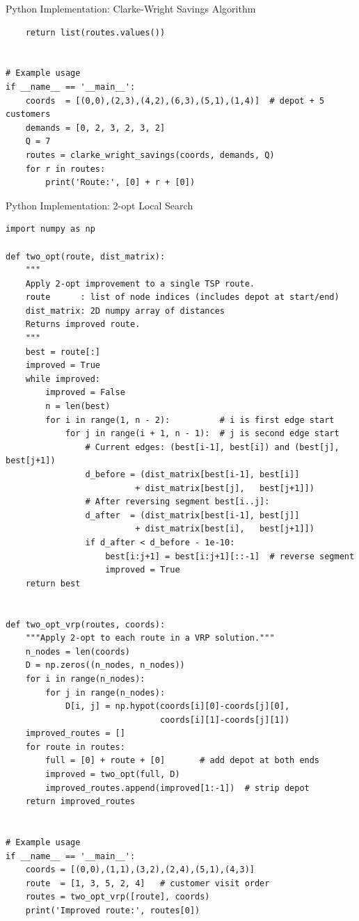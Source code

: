 \documentclass[aspectratio=169,10pt]{beamer}
\begin{document}
\begin{frame}[fragile]{Python Implementation: Clarke-Wright Savings Algorithm}
\begin{lstlisting}
    return list(routes.values())


# Example usage
if __name__ == '__main__':
    coords  = [(0,0),(2,3),(4,2),(6,3),(5,1),(1,4)]  # depot + 5 customers
    demands = [0, 2, 3, 2, 3, 2]
    Q = 7
    routes = clarke_wright_savings(coords, demands, Q)
    for r in routes:
        print('Route:', [0] + r + [0])
\end{lstlisting}
\end{frame}

\begin{frame}[fragile]{Python Implementation: 2-opt Local Search}
\begin{lstlisting}
import numpy as np

def two_opt(route, dist_matrix):
    """
    Apply 2-opt improvement to a single TSP route.
    route      : list of node indices (includes depot at start/end)
    dist_matrix: 2D numpy array of distances
    Returns improved route.
    """
    best = route[:]
    improved = True
    while improved:
        improved = False
        n = len(best)
        for i in range(1, n - 2):          # i is first edge start
            for j in range(i + 1, n - 1):  # j is second edge start
                # Current edges: (best[i-1], best[i]) and (best[j], best[j+1])
                d_before = (dist_matrix[best[i-1], best[i]]
                          + dist_matrix[best[j],   best[j+1]])
                # After reversing segment best[i..j]:
                d_after  = (dist_matrix[best[i-1], best[j]]
                          + dist_matrix[best[i],   best[j+1]])
                if d_after < d_before - 1e-10:
                    best[i:j+1] = best[i:j+1][::-1]  # reverse segment
                    improved = True
    return best


def two_opt_vrp(routes, coords):
    """Apply 2-opt to each route in a VRP solution."""
    n_nodes = len(coords)
    D = np.zeros((n_nodes, n_nodes))
    for i in range(n_nodes):
        for j in range(n_nodes):
            D[i, j] = np.hypot(coords[i][0]-coords[j][0],
                               coords[i][1]-coords[j][1])
    improved_routes = []
    for route in routes:
        full = [0] + route + [0]       # add depot at both ends
        improved = two_opt(full, D)
        improved_routes.append(improved[1:-1])  # strip depot
    return improved_routes


# Example usage
if __name__ == '__main__':
    coords = [(0,0),(1,1),(3,2),(2,4),(5,1),(4,3)]
    route  = [1, 3, 5, 2, 4]   # customer visit order
    routes = two_opt_vrp([route], coords)
    print('Improved route:', routes[0])
\end{lstlisting}
\end{frame}
\end{document}
